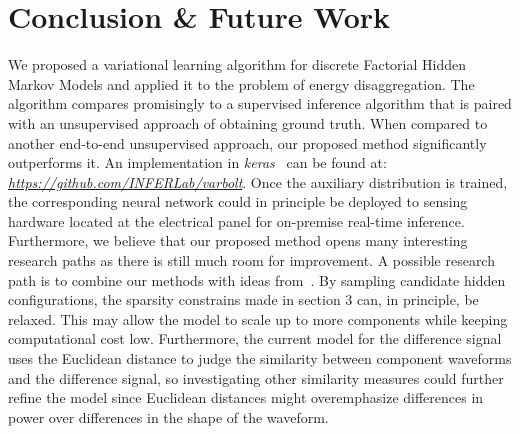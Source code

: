 \section{Conclusion \& Future Work}
We proposed a variational learning algorithm for discrete Factorial Hidden Markov Models and applied it to the problem of energy disaggregation. The algorithm compares promisingly to a supervised inference algorithm that is paired with an unsupervised approach of obtaining ground truth. When compared to another end-to-end unsupervised approach, our proposed method significantly outperforms it. An implementation in \emph{keras}~\cite{chollet2015} can be found at: \emph{\url{https://github.com/INFERLab/varbolt}}. Once the auxiliary distribution is trained, the corresponding neural network could in principle be deployed to sensing hardware located at the electrical panel for on-premise real-time inference.\\
Furthermore, we believe that our proposed method opens many interesting research paths as there is still much room for improvement. A possible research path is to combine our methods with ideas from~\cite{tang2013learning}. By sampling candidate hidden configurations, the sparsity constrains made in section 3 can, in principle, be relaxed. This may allow the model to scale up to more components while keeping computational cost low. Furthermore, the current model for the difference signal uses the Euclidean distance to judge the similarity between component waveforms and the difference signal, so investigating other similarity measures could further refine the model since Euclidean distances might overemphasize differences in power over differences in the shape of the waveform.

